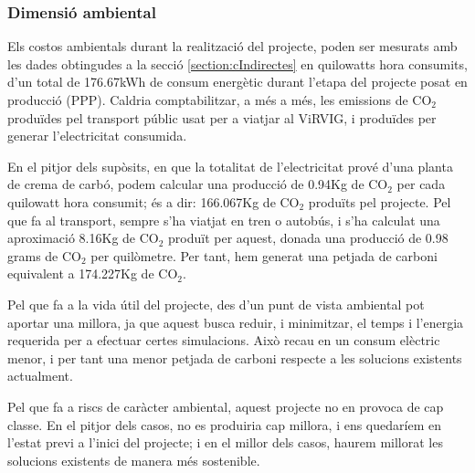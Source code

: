 \documentclass[a4paper]{article} %
\begin{document}
	\subsubsection{Dimensió ambiental}
	Els costos ambientals durant la realització del projecte, poden ser mesurats amb les dades obtingudes a la secció \ref{section:cIndirectes} en quilowatts hora consumits, d'un total de 176.67kWh de consum energètic durant l'etapa del projecte posat en producció (PPP). Caldria comptabilitzar, a més a més, les emissions de CO$_{2}$ produïdes pel transport públic usat per a viatjar al ViRVIG, i produïdes per generar l'electricitat consumida. \par
	En el pitjor dels supòsits, en que la totalitat de l'electricitat prové d'una planta de crema de carbó, podem calcular una producció de 0.94Kg de CO$_2$ per cada quilowatt hora consumit; és a dir: 166.067Kg de CO$_2$ produïts pel projecte. Pel que fa al transport, sempre s'ha viatjat en tren o autobús, i s'ha calculat una aproximació 8.16Kg de CO$_2$ produït per aquest, donada una producció de 0.98 grams de CO$_2$ per quilòmetre. Per tant, hem generat una petjada de carboni equivalent a 174.227Kg de CO$_2$. \par
	Pel que fa a la vida útil del projecte, des d'un punt de vista ambiental pot aportar una millora, ja que aquest busca reduir, i minimitzar, el temps i l'energia requerida per a efectuar certes simulacions. Això recau en un consum elèctric menor, i per tant una menor petjada de carboni respecte a les solucions existents actualment. \par
	Pel que fa a riscs de caràcter ambiental, aquest projecte no en provoca de cap classe. En el pitjor dels casos, no es produiria cap millora, i ens quedaríem en l'estat previ a l'inici del projecte; i en el millor dels casos, haurem millorat les solucions existents de manera més sostenible.
	
\end{document}

